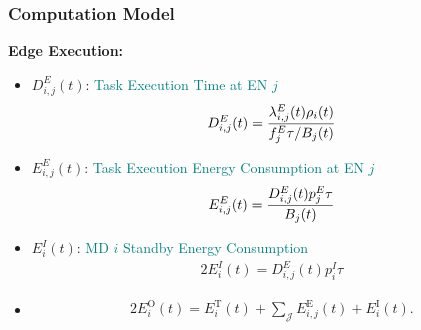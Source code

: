 \begin{frame}
	\frametitle{Computation Model}
	\textbf{Edge Execution:}
	
	\vfill
	
	\begin{itemize}[]
		
				\item $D_{i,j}^{E}(t)$:	\textcolor{teal}{Task Execution Time at EN $j$}
		\vspace{-2mm}
		\begin{alignat}{2}
			D_{i,j}^{E}(t) = { \lambda_{i,j}^{E}(t) \rho_i(t) \over f_j^{E} \tau /  B_j(t)}
			\label{14}  
		\end{alignat}
		
		
		
		\item $E_{i,j}^{E}(t)$:	\textcolor{teal}{Task Execution Energy Consumption at EN $j$}
		\vspace{-2mm}
		\begin{alignat}{2}
			E_{i,j}^{E}(t) = {D_{i,j}^{E}(t)  p_j^{E} \tau \over B_j(t)}  %
			\label{15}  
		\end{alignat}
		
		\item $E_i^{I}(t)$:	\textcolor{teal}{MD $i$ Standby Energy Consumption} 
		\begin{alignat}{2}
			E_i^{I}(t) = D_{i,j}^{E}(t) p_i^{I} \tau%
			\label{16}
		\end{alignat}
	
		\item 
		\begin{alignat}{2}
			E_i^{\text{O}}(t) = E_i^{\text{T}}(t) + \sum_{\mathcal{J}} E_{i,j}^{\text{E}}(t) + E_i^{\text{I}}(t).
			\label{17}
		\end{alignat}
		
		


	\end{itemize}
\end{frame}
